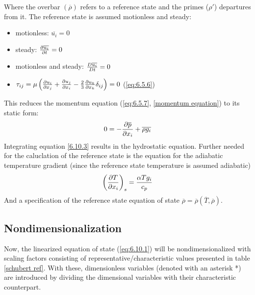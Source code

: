 \documentclass[document.tex]{subfiles}
\begin{document}
Where the overbar $(\overline{\rho})$ refers to a reference state and the primes ($\rho'$) departures from it. 
The reference state is assumed motionless and steady:
\begin{itemize}
    \item motionless: $\overline{u_i} = 0$
    \item steady: $\pdv{\overline{u_i}}{t} = 0$
    \item motionless and steady: $\frac{D \overline{u_i}}{D t} = 0$
    \item $\tau_{ij} = \mu \left(\pdv{u_i}{x_j}+\pdv{u_j}{x_i} - \frac{2}{3}\pdv{u_k}{x_k}\delta_{ij}\right) = 0$ (\ref{eq:6.5.6})
\end{itemize}
This reduces the momentum equation (\eqref{eq:6.5.7}, \ref{momentum equation}) to its static form: 
\begin{equation} \label{6.10.3}
    0 = -\pdv{\overline{p}}{x_i} + \overline{\rho g_i}
\end{equation}
Integrating equation \ref{6.10.3} results in the hydrostatic equation. Further needed for the caluclation of the reference
state is the equation for the adiabatic temperature gradient (since the reference state temperature is assumed adiabatic)
\begin{equation}
    \left(\pdv{T}{x_i}\right)_s = \frac{\alpha T g_i}{c_p}
\end{equation}
And a specification of the reference state equation of state $\overline{\rho} = \overline{\rho}(\overline{T}, \overline{\rho})$.

\subsection{Nondimensionalization}
Now, the linearized equation of state (\ref{eq:6.10.1}) will be nondimensionalized with scaling factors consisting of 
representative/characteristic values presented in table \ref{schubert ref}. With these, dimensionless variables (denoted with 
an asterisk *) are introduced by dividing the dimensional variables with their characteristic counterpart. 
\end{document}
